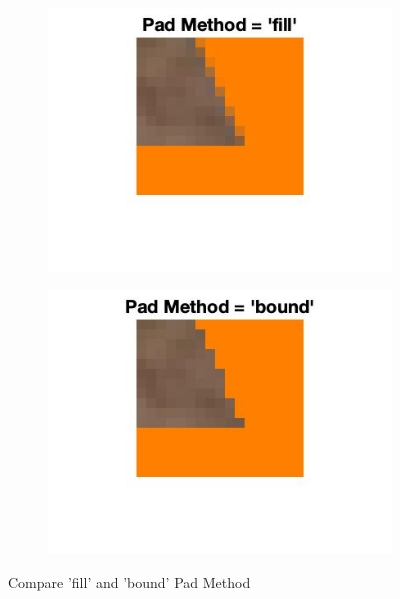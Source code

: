 \documentclass[conference]{IEEEtran}
\begin{document}
\begin{figure}[h!]
\centering
\begin{subfigure}[b]{0.7\linewidth}
\includegraphics[width=\linewidth]{images/img34.jpg}
\end{subfigure}
\begin{subfigure}[b]{0.7\linewidth}
\includegraphics[width=\linewidth]{images/img35.jpg}
\end{subfigure}
\caption{Compare 'fill' and 'bound' Pad Method}
\label{fig: compare}
\end{figure}
\end{document}
